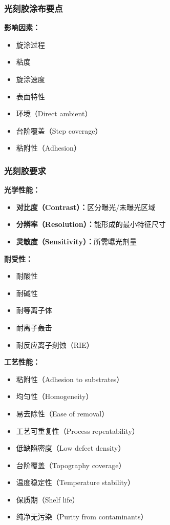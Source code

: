 \documentclass[UTF8,12pt,a4paper]{ctexart}
\begin{document}
\subsubsection{光刻胶涂布要点}

\textbf{影响因素：}
\begin{itemize}
    \item 旋涂过程
    \item 粘度
    \item 旋涂速度
    \item 表面特性
    \item 环境（Direct ambient）
    \item 台阶覆盖（Step coverage）
    \item 粘附性（Adhesion）
\end{itemize}

\subsubsection{光刻胶要求}

\textbf{光学性能：}
\begin{itemize}
    \item \textbf{对比度（Contrast）：}区分曝光/未曝光区域
    \item \textbf{分辨率（Resolution）：}能形成的最小特征尺寸
    \item \textbf{灵敏度（Sensitivity）：}所需曝光剂量
\end{itemize}

\textbf{耐受性：}
\begin{itemize}
    \item 耐酸性
    \item 耐碱性
    \item 耐等离子体
    \item 耐离子轰击
    \item 耐反应离子刻蚀（RIE）
\end{itemize}

\textbf{工艺性能：}
\begin{itemize}
    \item 粘附性（Adhesion to substrates）
    \item 均匀性（Homogeneity）
    \item 易去除性（Ease of removal）
    \item 工艺可重复性（Process repeatability）
    \item 低缺陷密度（Low defect density）
    \item 台阶覆盖（Topography coverage）
    \item 温度稳定性（Temperature stability）
    \item 保质期（Shelf life）
    \item 纯净无污染（Purity from contaminants）
\end{itemize}
\end{document}
